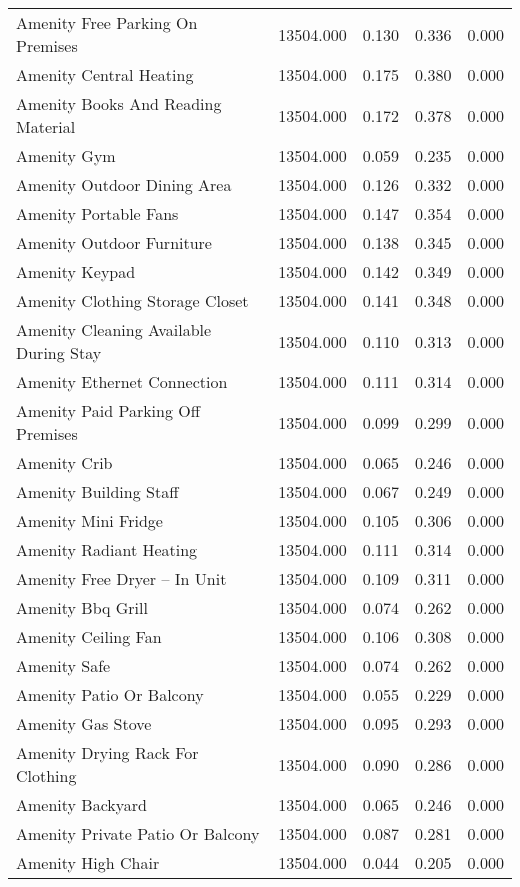 \begin{tabular}{lllll}
Amenity Free Parking On Premises & 13504.000 & 0.130 & 0.336 & 0.000 \\
Amenity Central Heating & 13504.000 & 0.175 & 0.380 & 0.000 \\
Amenity Books And Reading Material & 13504.000 & 0.172 & 0.378 & 0.000 \\
Amenity Gym & 13504.000 & 0.059 & 0.235 & 0.000 \\
Amenity Outdoor Dining Area & 13504.000 & 0.126 & 0.332 & 0.000 \\
Amenity Portable Fans & 13504.000 & 0.147 & 0.354 & 0.000 \\
Amenity Outdoor Furniture & 13504.000 & 0.138 & 0.345 & 0.000 \\
Amenity Keypad & 13504.000 & 0.142 & 0.349 & 0.000 \\
Amenity Clothing Storage Closet & 13504.000 & 0.141 & 0.348 & 0.000 \\
Amenity Cleaning Available During Stay & 13504.000 & 0.110 & 0.313 & 0.000 \\
Amenity Ethernet Connection & 13504.000 & 0.111 & 0.314 & 0.000 \\
Amenity Paid Parking Off Premises & 13504.000 & 0.099 & 0.299 & 0.000 \\
Amenity Crib & 13504.000 & 0.065 & 0.246 & 0.000 \\
Amenity Building Staff & 13504.000 & 0.067 & 0.249 & 0.000 \\
Amenity Mini Fridge & 13504.000 & 0.105 & 0.306 & 0.000 \\
Amenity Radiant Heating & 13504.000 & 0.111 & 0.314 & 0.000 \\
Amenity Free Dryer – In Unit & 13504.000 & 0.109 & 0.311 & 0.000 \\
Amenity Bbq Grill & 13504.000 & 0.074 & 0.262 & 0.000 \\
Amenity Ceiling Fan & 13504.000 & 0.106 & 0.308 & 0.000 \\
Amenity Safe & 13504.000 & 0.074 & 0.262 & 0.000 \\
Amenity Patio Or Balcony & 13504.000 & 0.055 & 0.229 & 0.000 \\
Amenity Gas Stove & 13504.000 & 0.095 & 0.293 & 0.000 \\
Amenity Drying Rack For Clothing & 13504.000 & 0.090 & 0.286 & 0.000 \\
Amenity Backyard & 13504.000 & 0.065 & 0.246 & 0.000 \\
Amenity Private Patio Or Balcony & 13504.000 & 0.087 & 0.281 & 0.000 \\
Amenity High Chair & 13504.000 & 0.044 & 0.205 & 0.000 \\

\end{tabular}

